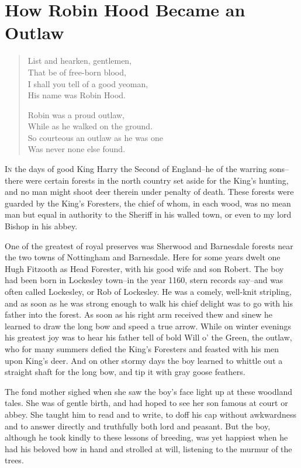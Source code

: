 \chapter{How Robin Hood Became an Outlaw}

\begin{quote}
List and hearken, gentlemen,\\
That be of free-born blood,\\
I shall you tell of a good yeoman,\\
His name was Robin Hood.

Robin was a proud outlaw,\\
While as he walked on the ground.\\
So courteous an outlaw as he was one\\
Was never none else found.
\end{quote}

\lettrine{I}{n} the days of good King Harry the Second of England--he of
the warring sons--there were certain forests in the north country set
aside for the King's hunting, and no man might shoot deer therein under
penalty of death. These forests were guarded by the King's Foresters, the
chief of whom, in each wood, was no mean man but equal in authority to
the Sheriff in his walled town, or even to my lord Bishop in his abbey.

One of the greatest of royal preserves was Sherwood and Barnesdale
forests near the two towns of Nottingham and Barnesdale. Here for some
years dwelt one Hugh Fitzooth as Head Forester, with his good wife and
son Robert. The boy had been born in Lockesley town--in the year 1160,
stern records say--and was often called Lockesley, or Rob of Lockesley.
He was a comely, well-knit stripling, and as soon as he was strong
enough to walk his chief delight was to go with his father into the
forest. As soon as his right arm received thew and sinew he learned to
draw the long bow and speed a true arrow. While on winter evenings his
greatest joy was to hear his father tell of bold Will o' the Green, the
outlaw, who for many summers defied the King's Foresters and feasted
with his men upon King's deer. And on other stormy days the boy learned
to whittle out a straight shaft for the long bow, and tip it with gray
goose feathers.

The fond mother sighed when she saw the boy's face light up at these
woodland tales. She was of gentle birth, and had hoped to see her son
famous at court or abbey. She taught him to read and to write, to doff
his cap without awkwardness and to answer directly and truthfully both
lord and peasant. But the boy, although he took kindly to these lessons
of breeding, was yet happiest when he had his beloved bow in hand and
strolled at will, listening to the murmur of the trees.

